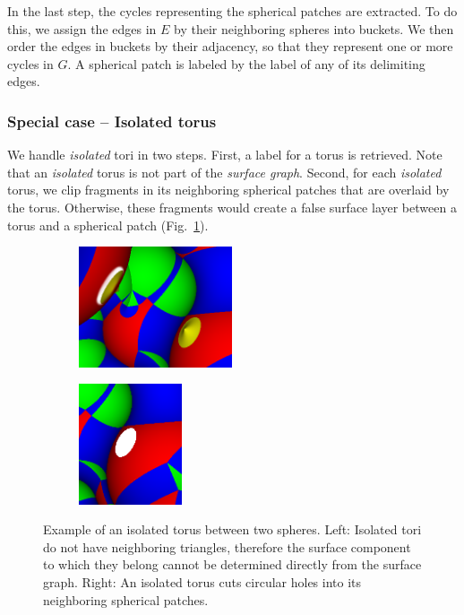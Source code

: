In the last step, the cycles representing the spherical patches are extracted.
To do this, we assign the edges in $E$ by their neighboring spheres into buckets.
We then order the edges in buckets by their adjacency, so that they represent one or more cycles in $G$.
A spherical patch is labeled by the label of any of its delimiting edges.

\subsubsection{Special case -- Isolated torus}
\label{sec:isolated}

We handle \textit{isolated} tori in two steps.
First, a label for a torus is retrieved. Note that an \textit{isolated} torus is not part of the \textit{surface graph}.
Second, for each \textit{isolated} torus, we clip fragments in its neighboring spherical patches that are overlaid by the torus. Otherwise, these fragments would create a false surface layer between a torus and a spherical patch (Fig.~\ref{fig:isolated-hole}).

\begin{figure}[htp]
  \centering
  \begin{subfigure}[t]{0.55\columnwidth}
    \centering
    \includegraphics[height=1.4in]{image/isolated-cutaway2.png}
  \end{subfigure}%
  \quad
  \begin{subfigure}[t]{0.4\columnwidth}
    \centering
    \includegraphics[height=1.4in]{image/isolated-hole.png}
  \end{subfigure}
\caption{Example of an isolated torus between two spheres.
	Left: Isolated tori do not have neighboring triangles, therefore the surface component to which they belong cannot be determined directly from the surface graph. 	Right: An isolated torus cuts circular holes into its neighboring spherical patches.}
\label{fig:isolated-hole}
\end{figure}

